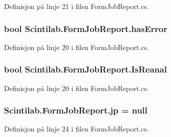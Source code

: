 Definisjon på linje 21 i filen Form\+Job\+Report.\+cs.

\hypertarget{class_scintilab_1_1_form_job_report_aa9d718d9966b2d6263142d811c4690ef}{
\subsubsection[{has\+Error}]{\setlength{\rightskip}{0pt plus 5cm}bool Scintilab.\+Form\+Job\+Report.\+has\+Error\hspace{0.3cm}{\ttfamily [private]}}}\label{class_scintilab_1_1_form_job_report_aa9d718d9966b2d6263142d811c4690ef}


Definisjon på linje 20 i filen Form\+Job\+Report.\+cs.

\hypertarget{class_scintilab_1_1_form_job_report_ad6eadf59048ecf2909b4e6c0fd48751f}{
\subsubsection[{Is\+Reanal}]{\setlength{\rightskip}{0pt plus 5cm}bool Scintilab.\+Form\+Job\+Report.\+Is\+Reanal\hspace{0.3cm}{\ttfamily [private]}}}\label{class_scintilab_1_1_form_job_report_ad6eadf59048ecf2909b4e6c0fd48751f}


Definisjon på linje 20 i filen Form\+Job\+Report.\+cs.

\hypertarget{class_scintilab_1_1_form_job_report_abf5ab85e5b06729f1494a9e1c6877d7e}{
\subsubsection[{jp}]{ Scintilab.\+Form\+Job\+Report.\+jp = null\hspace{0.3cm}{\ttfamily [private]}}}\label{class_scintilab_1_1_form_job_report_abf5ab85e5b06729f1494a9e1c6877d7e}


Definisjon på linje 24 i filen Form\+Job\+Report.\+cs.

